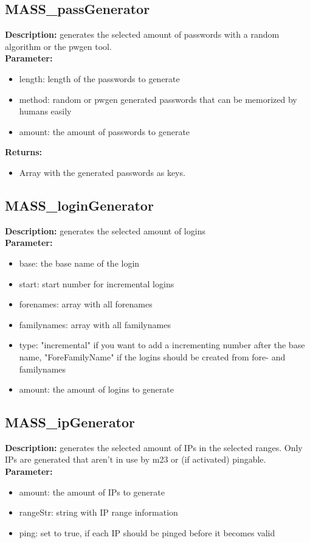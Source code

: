 \subsection{MASS\_passGenerator}
\textbf{Description:} generates the selected amount of passwords with a random algorithm or the pwgen tool.\\
\textbf{Parameter:}
\begin{itemize}
\item length: length of the passwords to generate
\item method: random or pwgen generated passwords that can be memorized by humans easily
\item amount: the amount of passwords to generate
\end{itemize}
\textbf{Returns:}
\begin{itemize}
\item Array with the generated passwords as keys.
\end{itemize}

\subsection{MASS\_loginGenerator}
\textbf{Description:} generates the selected amount of logins\\
\textbf{Parameter:}
\begin{itemize}
\item base: the base name of the login
\item start: start number for incremental logins
\item forenames: array with all forenames
\item familynames: array with all familynames
\item type: "incremental" if you want to add a incrementing number after the base name, "ForeFamilyName" if the logins should be created from fore- and familynames
\item amount: the amount of logins to generate
\end{itemize}

\subsection{MASS\_ipGenerator}
\textbf{Description:} generates the selected amount of IPs in the selected ranges. Only IPs are generated that aren't in use by m23 or (if activated) pingable.\\
\textbf{Parameter:}
\begin{itemize}
\item amount: the amount of IPs to generate
\item rangeStr: string with IP range information
\item ping: set to true, if each IP should be pinged before it becomes valid
\end{itemize}

